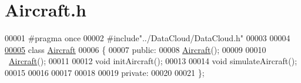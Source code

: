 \hypertarget{_aircraft_8h_source}{}\section{Aircraft.\+h}
\label{_aircraft_8h_source}

\begin{DoxyCode}
00001 \textcolor{preprocessor}{#pragma once}
00002 \textcolor{preprocessor}{#include"../DataCloud/DataCloud.h"}
00003 
00004 
\hyperlink{class_aircraft}{00005} \textcolor{keyword}{class }\hyperlink{class_aircraft}{Aircraft}
00006 \{
00007 \textcolor{keyword}{public}:
00008     \hyperlink{class_aircraft}{Aircraft}();
00009 
00010     ~\hyperlink{class_aircraft}{Aircraft}();
00011 
00012     \textcolor{keywordtype}{void} initAircraft();
00013 
00014     \textcolor{keywordtype}{void} simulateAircraft();
00015 
00016 
00017 
00018 
00019 \textcolor{keyword}{private}:
00020 
00021 \};
\end{DoxyCode}
